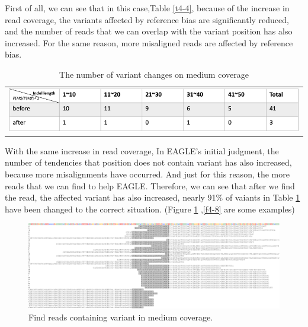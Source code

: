 First of all, we can see that in this case,Table \ref{t4-4}, because of the increase in read coverage, the variants affected by reference bias are significantly reduced, and the number of reads that we can overlap with the variant position has also increased. For the same reason, more misaligned reads are affected by reference bias.

\vspace{1cm}
\begin{table}[h]
    \centering
    \caption{The number of variant changes on medium coverage}
    \vspace{-0.5cm}
    \begin{tabular}{c}
        \includegraphics[width=1\textwidth]{body/image/t4-5.png}
    \end{tabular}
    \label{t4-5}
\end{table}

With the same increase in read coverage, In EAGLE’s initial judgment, the number of tendencies that position does not contain variant has also increased, because more misalignments have occurred. And just for this reason, the more reads that we can find to help EAGLE. Therefore, we can see that after we find the read, the affected variant has also increased, nearly 91\% of vaiants in Table \ref{t4-5} have been changed to the correct situation. (Figure \ref{f4-7} ,\ref{f4-8} are some examples)

\vspace{1cm}
\begin{figure}[H]
    \centering
    \includegraphics[width=1\columnwidth]{body/image/4-7.png}
    \captionsetup{labelfont=bf}
    \renewcommand{\baselinestretch}{1.0}
    \vspace{-1cm}
    \caption[Find variant reads in medium coverage]{Find reads containing variant in medium coverage.}
    \label{f4-7}
\end{figure}

